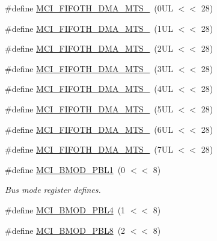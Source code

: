 \begin{DoxyCompactItemize}
\item 
\#define \hyperlink{group___s_d_i_f__18_x_x__43_x_x_ga90839b69c1b19367cda8c677dd3202fe}{M\+C\+I\+\_\+\+F\+I\+F\+O\+T\+H\+\_\+\+D\+M\+A\+\_\+\+M\+T\+S\+\_}~(0\+U\+L $<$$<$ 28)
\item 
\#define \hyperlink{group___s_d_i_f__18_x_x__43_x_x_ga0a4e6a5d75c4d69313698babb35509be}{M\+C\+I\+\_\+\+F\+I\+F\+O\+T\+H\+\_\+\+D\+M\+A\+\_\+\+M\+T\+S\+\_}~(1\+U\+L $<$$<$ 28)
\item 
\#define \hyperlink{group___s_d_i_f__18_x_x__43_x_x_ga619ef2a5a3df0b18181d6018eb8c2e6c}{M\+C\+I\+\_\+\+F\+I\+F\+O\+T\+H\+\_\+\+D\+M\+A\+\_\+\+M\+T\+S\+\_}~(2\+U\+L $<$$<$ 28)
\item 
\#define \hyperlink{group___s_d_i_f__18_x_x__43_x_x_ga067737446694d714a5a6196cde3ad403}{M\+C\+I\+\_\+\+F\+I\+F\+O\+T\+H\+\_\+\+D\+M\+A\+\_\+\+M\+T\+S\+\_}~(3\+U\+L $<$$<$ 28)
\item 
\#define \hyperlink{group___s_d_i_f__18_x_x__43_x_x_gac79c8327e4e7193225b2dab89bc33970}{M\+C\+I\+\_\+\+F\+I\+F\+O\+T\+H\+\_\+\+D\+M\+A\+\_\+\+M\+T\+S\+\_}~(4\+U\+L $<$$<$ 28)
\item 
\#define \hyperlink{group___s_d_i_f__18_x_x__43_x_x_gadc6abfcb938e3ac834cfb0300d71c375}{M\+C\+I\+\_\+\+F\+I\+F\+O\+T\+H\+\_\+\+D\+M\+A\+\_\+\+M\+T\+S\+\_}~(5\+U\+L $<$$<$ 28)
\item 
\#define \hyperlink{group___s_d_i_f__18_x_x__43_x_x_gaad3fc8ff3f7b15cda268ee4bbb74ad91}{M\+C\+I\+\_\+\+F\+I\+F\+O\+T\+H\+\_\+\+D\+M\+A\+\_\+\+M\+T\+S\+\_}~(6\+U\+L $<$$<$ 28)
\item 
\#define \hyperlink{group___s_d_i_f__18_x_x__43_x_x_ga1be13c2ce6cbb46011ff0aa0ac178712}{M\+C\+I\+\_\+\+F\+I\+F\+O\+T\+H\+\_\+\+D\+M\+A\+\_\+\+M\+T\+S\+\_}~(7\+U\+L $<$$<$ 28)
\item 
\#define \hyperlink{group___s_d_i_f__18_x_x__43_x_x_ga0813b6b5ee7658b090403123e5444a25}{M\+C\+I\+\_\+\+B\+M\+O\+D\+\_\+\+P\+B\+L1}~(0 $<$$<$ 8)
\begin{DoxyCompactList}\small\item\em Bus mode register defines. \end{DoxyCompactList}\item 
\#define \hyperlink{group___s_d_i_f__18_x_x__43_x_x_ga30bd9f27c3dc69cb6ce5b9998e4d3ac1}{M\+C\+I\+\_\+\+B\+M\+O\+D\+\_\+\+P\+B\+L4}~(1 $<$$<$ 8)
\item 
\#define \hyperlink{group___s_d_i_f__18_x_x__43_x_x_gacbe48b6df1fdbfdb2dfafc460a32ea0e}{M\+C\+I\+\_\+\+B\+M\+O\+D\+\_\+\+P\+B\+L8}~(2 $<$$<$ 8)
\item 
$$
\end{DoxyCompactItemize}

